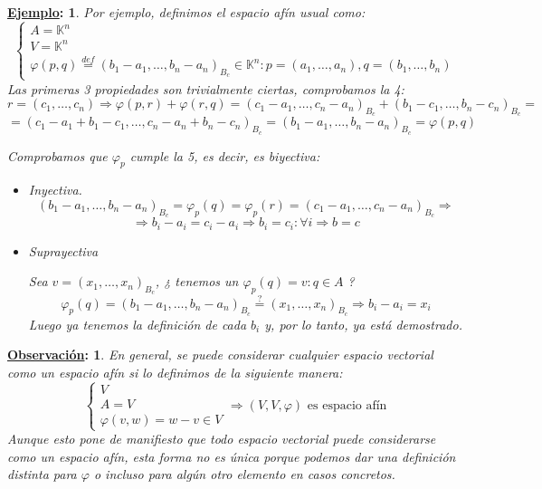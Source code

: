 \documentclass[10pt,a4paper,openright]{book}
\theoremstyle{break}
\newtheorem*{obs}{\underline{Observación}:}
\newtheorem*{ej}{\underline{Ejemplo}:}
\begin{document}
\begin{ej}
Por ejemplo, definimos el espacio afín usual como:
$$\begin{cases} A = \mathbb{K}^n \\ V = \mathbb{K}^n \\ \varphi(p,q) \overset{def}{=} (b_1 - a_1 , \ldots , b_n - a_n)_{B_c} \in \mathbb{K}^n : p=(a_1, \ldots , a_n), q=(b_1, \ldots, b_n) \end{cases}$$
Las primeras 3 propiedades son trivialmente ciertas, comprobamos la 4:
$$r=(c_1, \ldots, c_n) \Rightarrow \varphi(p,r) + \varphi (r,q) = (c_1 - a_1 , \ldots, c_n - a_n)_{B_c} + (b_1 - c_1 , \ldots, b_n - c_n)_{B_c} =$$
$$= (c_1 - a_1 + b_1 - c_1, \ldots,c_n - a_n + b_n - c_n)_{B_c} = (b_1 - a_1 , \ldots , b_n - a_n)_{B_c} = \varphi(p,q) $$

Comprobamos que $\varphi_p $ cumple la 5, es decir, es biyectiva:
\begin{itemize}
\item Inyectiva.
$$(b_1 - a_1 , \ldots , b_n - a_n)_{B_c}= \varphi_p (q) = \varphi_p (r) = (c_1 - a_1 , \ldots , c_n - a_n)_{B_c} \Rightarrow $$
$$\Rightarrow b_i - a_i = c_i - a_i \Rightarrow b_i = c_i : \forall i \Rightarrow b = c$$

\item Suprayectiva

Sea $v=(x_1, \ldots, x_n)_{B_c}$, ¿ tenemos un $ \varphi_p (q) = v : q\in A$ ?
$$\varphi_p (q)=(b_1 - a_1 , \ldots , b_n - a_n)_{B_c}\overset{?}{=}(x_1, \ldots, x_n)_{B_c} \Rightarrow b_i - a_i = x_i$$
Luego ya tenemos la definición de cada $b_i$ y, por lo tanto, ya está demostrado.
\end{itemize}
\end{ej}

\begin{obs}
En general, se puede considerar cualquier espacio vectorial como un espacio afín si lo definimos de la siguiente manera:
$$\begin{cases} V \\ A = V \\ \varphi(v,w) = w - v \in V \end{cases} \Rightarrow (V,V,\varphi)\mbox{ es espacio afín}$$
Aunque esto pone de manifiesto que todo espacio vectorial puede considerarse como un espacio afín, esta forma no es única porque podemos dar una definición distinta para $\varphi$ o incluso para algún otro elemento en casos concretos.
\end{obs}
\end{document}
